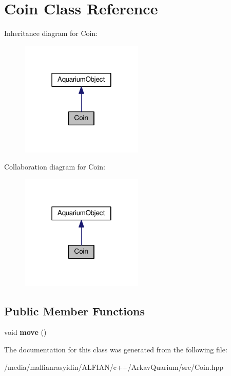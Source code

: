 \hypertarget{class_coin}{}\section{Coin Class Reference}
\label{class_coin}


Inheritance diagram for Coin\+:\nopagebreak
\begin{figure}[H]
\begin{center}
\leavevmode
\includegraphics[width=166pt]{class_coin__inherit__graph}
\end{center}
\end{figure}


Collaboration diagram for Coin\+:\nopagebreak
\begin{figure}[H]
\begin{center}
\leavevmode
\includegraphics[width=166pt]{class_coin__coll__graph}
\end{center}
\end{figure}
\subsection*{Public Member Functions}
\begin{DoxyCompactItemize}
\item 
\mbox{\label{class_coin_ab62bca5834489b9b483deaa3ca3470e9}} 
void {\bfseries move} ()
\end{DoxyCompactItemize}


The documentation for this class was generated from the following file\+:\begin{DoxyCompactItemize}
\item 
/media/malfianrasyidin/\+A\+L\+F\+I\+A\+N/c++/\+Arkav\+Quarium/src/Coin.\+hpp\end{DoxyCompactItemize}
